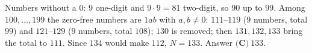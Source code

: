 Numbers without a $0$: $9$ one-digit and $9\cdot9=81$ two-digit, so $90$ up to $99$. Among $100,\dots,199$ the zero-free numbers are $1ab$ with $a,b\ne0$: $111$--$119$ ($9$ numbers, total $99$) and $121$--$129$ ($9$ numbers, total $108$); $130$ is removed; then $131,132,133$ bring the total to $111$. Since $134$ would make $112$, $N=133$. Answer $\boxed{\textbf{(C)}\ 133}$.
